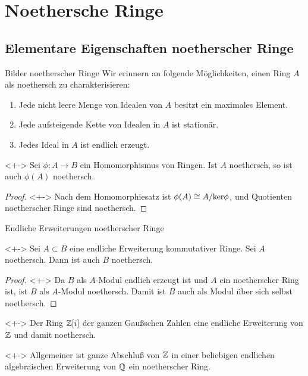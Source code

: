 \section{Noethersche Ringe}

\subsection{Elementare Eigenschaften noetherscher Ringe}

\begin{frame}{Bilder noetherscher Ringe}
	Wir erinnern an folgende Möglichkeiten, einen Ring \(A\) als noethersch zu
	charakterisieren:
	\begin{enumerate}[<+->]
	\item
		Jede nicht leere Menge von Idealen von \(A\) besitzt ein maximales Element.
	\item
		Jede aufsteigende Kette von Idealen in \(A\) ist stationär.
	\item
		Jedes Ideal in \(A\) ist endlich erzeugt.
	\end{enumerate}
	\begin{proposition}<+->
		Sei \(\phi\colon A \to B\) ein Homomorphismus von Ringen. Ist \(A\)
		noethersch, so ist auch \(\phi(A)\) noethersch.
	\end{proposition}
	\begin{proof}<+->
		Nach dem Homomorphiesatz ist \(\phi(A) \cong A/\mathfrak{\ker} \phi\), und
		Quotienten noetherscher Ringe sind noethersch.
	\end{proof}
\end{frame}

\begin{frame}{Endliche Erweiterungen noetherscher Ringe}
	\begin{proposition}<+->
		Sei \(A \subset B\) eine endliche Erweiterung kommutativer Ringe.
		Sei \(A\) noethersch. Dann ist auch \(B\) noethersch.
	\end{proposition}
	\begin{proof}<+->
		Da \(B\) als \(A\)-Modul endlich erzeugt ist und \(A\) ein noetherscher Ring
		ist, ist \(B\) als \(A\)-Modul noethersch. Damit ist \(B\) auch als
		Modul über sich selbst noethersch.
	\end{proof}
	\begin{example}<+->
		Der Ring \(\mathbb Z[i]\) der ganzen Gaußschen Zahlen eine endliche Erweiterung
		von \(\mathbb Z\) und damit noethersch.
	\end{example}
	\begin{remark}<+->
		Allgemeiner ist ganze Abschluß von \(\mathbb Z\) in einer beliebigen endlichen
		algebraischen Erweiterung von \(\mathbb Q\) ein noetherscher Ring.
	\end{remark}
\end{frame}

